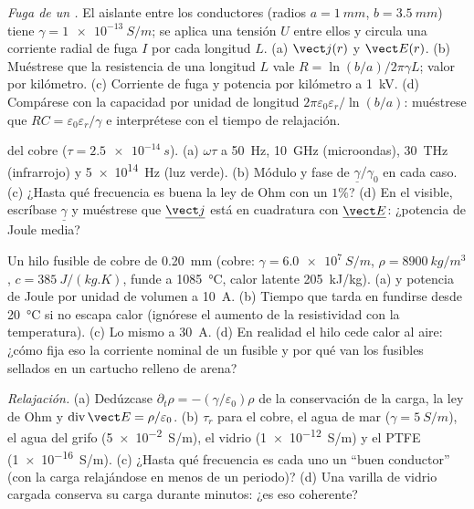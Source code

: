 \begin{exercise}[$\star\star$]\label{exo:b2:charges-currents-conduction:6}
\emph{Fuga de un .} El aislante entre los conductores
(radios $a = \qty{1}{mm}$, $b = \qty{3.5}{mm}$) tiene $\gamma = \qty{1e-13}{S/m}$; se
aplica una tensión $U$ entre ellos y circula una corriente radial de fuga
$I$ por cada longitud $L$. (a) $\vect j(r)$ y $\vect E(r)$. (b) Muéstrese que
la resistencia de una longitud $L$ vale $R = \ln(b/a)/2\pi\gamma L$; valor por
kilómetro. (c) Corriente de fuga y potencia por kilómetro a \qty{1}{kV}.
(d) Compárese con la capacidad por unidad de longitud $2\pi\varepsilon_0\varepsilon_r/\ln(b/a)$:
muéstrese que $RC = \varepsilon_0\varepsilon_r/\gamma$ e interprétese con el tiempo de relajación.
\end{exercise}

\begin{exercise}[$\star\star$]\label{exo:b2:charges-currents-conduction:7}
 del cobre ($\tau = \qty{2.5e-14}{s}$). (a) $\omega\tau$ a
\qty{50}{Hz}, \qty{10}{GHz} (microondas), \qty{30}{THz} (infrarrojo) y \qty{5e14}{Hz}
(luz verde). (b) Módulo y fase de $\underline\gamma/\gamma_0$ en cada caso.
(c) ¿Hasta qué frecuencia es buena la ley de Ohm con un $1\%$? (d) En el
visible, escríbase $\underline\gamma$ y muéstrese que $\underline{\vect j}$ está en
cuadratura con $\underline{\vect E}$: ¿potencia de Joule media?
\end{exercise}

\begin{exercise}[$\star\star$]\label{exo:b2:charges-currents-conduction:8}
Un hilo fusible de cobre de \qty{0.20}{mm} (cobre: $\gamma = \qty{6.0e7}{S/m}$, $\rho =
\qty{8900}{kg/m^3}$, $c = \qty{385}{J/(kg.K)}$, funde a \qty{1085}{\degreeCelsius},
calor latente \qty{205}{kJ/kg}). (a)  y potencia de Joule por
unidad de volumen a \qty{10}{A}. (b) Tiempo que tarda en fundirse desde \qty{20}{\degreeCelsius} si no
escapa calor (ignórese el aumento de la resistividad con la temperatura). (c)
Lo mismo a \qty{30}{A}. (d) En realidad el hilo cede calor al aire: ¿cómo
fija eso la corriente nominal de un fusible y por qué van los fusibles
sellados en un cartucho relleno de arena?
\end{exercise}

\begin{exercise}[$\star\star$]\label{exo:b2:charges-currents-conduction:9}
\emph{Relajación.} (a) Dedúzcase $\partial_t\rho = -(\gamma/\varepsilon_0)\rho$ de la
conservación de la carga, la ley de Ohm y $\operatorname{div}\vect E = \rho/\varepsilon_0$. (b)
$\tau_r$ para el cobre, el agua de mar ($\gamma = \qty{5}{S/m}$), el agua del grifo
(\qty{5e-2}{S/m}), el vidrio (\qty{1e-12}{S/m}) y el PTFE (\qty{1e-16}{S/m}). (c)
¿Hasta qué frecuencia es cada uno un ``buen conductor'' (con la carga
relajándose en menos de un periodo)? (d) Una varilla de vidrio cargada
conserva su carga durante minutos: ¿es eso coherente?
\end{exercise}

